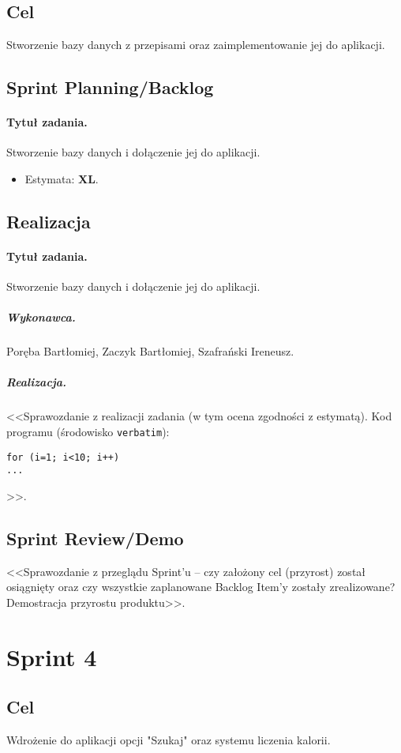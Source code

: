 \documentclass[a4paper]{article}
\begin{document}
\subsection{Cel} Stworzenie bazy danych z przepisami oraz zaimplementowanie jej do aplikacji.

\subsection{Sprint Planning/Backlog}

\paragraph{Tytuł zadania.} Stworzenie bazy danych i dołączenie jej do aplikacji.
\begin{itemize}
	\item Estymata: \textbf{XL}.
\end{itemize}


\subsection{Realizacja}

\paragraph{Tytuł zadania.}  Stworzenie bazy danych i dołączenie jej do aplikacji.
\subparagraph{Wykonawca.} Poręba Bartłomiej, Zaczyk Bartłomiej, Szafrański Ireneusz.
\subparagraph{Realizacja.} <<Sprawozdanie z realizacji zadania (w tym ocena zgodności z estymatą). Kod programu (środowisko \texttt{verbatim}): \begin{verbatim}
for (i=1; i<10; i++)
...
\end{verbatim}>>.



\subsection{Sprint Review/Demo}
<<Sprawozdanie z przeglądu Sprint'u -- czy założony cel (przyrost) został osiągnięty oraz czy wszystkie zaplanowane Backlog Item'y zostały zrealizowane? Demostracja przyrostu produktu>>.


\section{Sprint 4}

\subsection{Cel} Wdrożenie do aplikacji opcji "Szukaj" oraz systemu liczenia kalorii.
\end{document}
